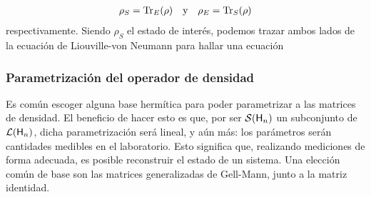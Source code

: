 \begin{align*}
    \rho_{S}=\Tr_{E}(\rho) & & \text{y} & & \rho_{E}=\Tr_{S}(\rho)
\end{align*}
respectivamente. Siendo $\rho_{S}$ el estado de interés, podemos trazar ambos lados de la ecuación de Liouville-von Neumann para hallar una ecuación 

\fi
\subsubsection{Parametrización del operador de densidad}

Es común escoger alguna base hermítica para poder parametrizar a las matrices de densidad. El beneficio de hacer esto es que, por ser $\mathcal{S}({\sf H}_{n})$ un subconjunto de $\mathcal{L}({\sf H}_{n})$, dicha parametrización será lineal, y aún más: los parámetros serán cantidades medibles en el laboratorio. Esto significa que, realizando mediciones de forma adecuada, es posible reconstruir el estado de un sistema. Una elección común de base son las matrices generalizadas de Gell-Mann, junto a la matriz identidad.
\iffalse
\acnote{Remplaza:-------}
\ddnote*{la base es hermitiana, el espacio no, lo hablamos en la reunión}{Cualquier matriz de densidad puede descomponerse en términos de una base del espacio de matrices hermitianas de $n\times n$.} \ddnote*{Tengo entendido que la identidad es también un generador de SU(2), checa bien esto}{Una elección común de base para el espacio es el de los generadores $\{\varsigma_{k}\}$ del grupo $\text{SU}(n)$, junto a la matriz identidad $\Id_{n}$}. Esto es particularmente útil, \ddnote*{ya que}{pues }permite parametrizar a las matrices de densidad de forma vectorial \cite{Bruning}. 
\acnote{---------fin}
\fi

